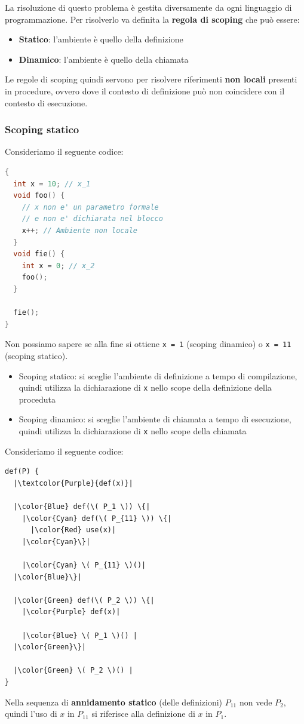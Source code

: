 \documentclass[a4paper]{article}
\begin{document}
\noindent
La risoluzione di questo problema è gestita diversamente da ogni linguaggio di
programmazione. Per risolverlo va definita la \textbf{regola di scoping} che
può essere:
\begin{itemize}
  \item \textbf{Statico}: l'ambiente è quello della definizione
  \item \textbf{Dinamico}: l'ambiente è quello della chiamata
\end{itemize}
Le regole di scoping quindi servono per risolvere riferimenti \textbf{non locali}
presenti in procedure, ovvero dove il contesto di definizione può non
coincidere con il contesto di esecuzione.

\subsubsection{Scoping statico}
\begin{Example}{}{}
  Consideriamo il seguente codice:
\begin{lstlisting}[language=C]
{
  int x = 10; // x_1
  void foo() {
    // x non e' un parametro formale
    // e non e' dichiarata nel blocco
    x++; // Ambiente non locale
  }
  void fie() {
    int x = 0; // x_2
    foo();
  }

  fie();
}
\end{lstlisting}
Non possiamo sapere se alla fine si ottiene \texttt{x = 1} (scoping dinamico) o
\texttt{x = 11} (scoping statico).
\begin{itemize}
  \item Scoping statico: si sceglie l'ambiente di definizione a tempo di compilazione,
    quindi utilizza la dichiarazione di \texttt{x} nello scope della definizione
    della proceduta
  \item Scoping dinamico: si sceglie l'ambiente di chiamata a tempo di esecuzione,
    quindi utilizza la dichiarazione di \texttt{x} nello scope della chiamata
\end{itemize}
\end{Example}

\noindent
Consideriamo il seguente codice:
\begin{lstlisting}[escapechar=|, basicstyle=\ttfamily, columns=fullflexible, keepspaces=true]
def(P) {
  |\textcolor{Purple}{def(x)}|

  |\color{Blue} def(\( P_1 \)) \{|
    |\color{Cyan} def(\( P_{11} \)) \{|
      |\color{Red} use(x)|
    |\color{Cyan}\}|

    |\color{Cyan} \( P_{11} \)()|
  |\color{Blue}\}|

  |\color{Green} def(\( P_2 \)) \{|
    |\color{Purple} def(x)|

    |\color{Blue} \( P_1 \)() |
  |\color{Green}\}|

  |\color{Green} \( P_2 \)() |
}
\end{lstlisting}
Nella sequenza di \textbf{annidamento statico} (delle definizioni) \( P_{11} \)  non
vede \( P_2 \), quindi l'uso di \( x \) in \( P_{11} \) si riferisce alla definizione
di \( x \) in \( P_1 \).
\end{document}
